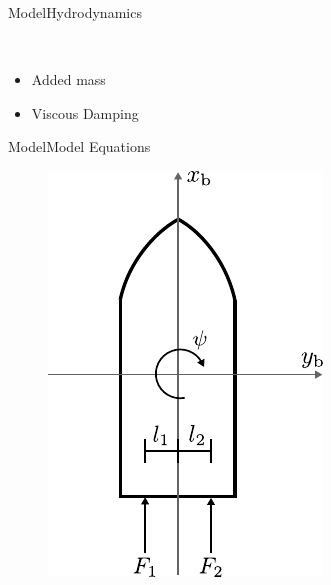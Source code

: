 \begin{frame}{Model}{Hydrodynamics}
\begin{minipage}{0.3\linewidth}
\begin{figure}[H]
        \end{figure}                
    \end{minipage}\hfill \\
    \begin{itemize}
        \item Added mass
        \item Viscous Damping
    \end{itemize}
\end{frame}

\begin{frame}{Model}{Model Equations}
    \begin{minipage}{0.3\linewidth}
        \begin{figure}[H]
            \centering
            \includegraphics[width=1\linewidth]{figures/boat2D}

\end{figure}
\end{minipage}
\end{frame}
